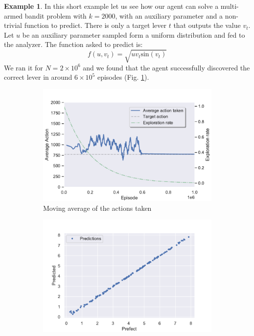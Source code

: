 \documentclass[11pt,a4paper,twoside]{report}
\newcommand{\+}{\textnormal{+} }
\theoremstyle{definition}
\newtheorem{myex}[mythm]{Example}
\numberwithin{equation}{chapter}
\begin{document}
  \begin{myex} \label{2k}
    In this short example let us see how our agent can solve a multi-armed
    bandit problem with $k=2000$, with an auxiliary parameter and a non-trivial
    function to predict. There is only a target lever $t$ that outputs the value
    $v_t$. Let $u$ be an auxiliary parameter sampled form a uniform distribution
    and fed to the analyzer. The function asked to predict is: 
    \begin{equation}
      f(u,v_t)=\sqrt{uv_t\text{sin}(v_t)}
    \end{equation}
    We ran it for $N=2\times10^6$ and we found that the agent successfully 
    discovered the correct lever in around $6\times10^5$ episodes
    (Fig. \ref{fig:ActionAverageMAB6}).
    

    \begin{figure}[]
      \centering
      \begin{subfigure}{.5\textwidth}
        \centering
        \includegraphics[width=1\linewidth]{figures/Action-MAB6.pdf}
        \caption{Moving average of the actions taken}
        \label{fig:ActionAverageMAB6}
      \end{subfigure}%
      \begin{subfigure}{.5\textwidth}
        \centering
        \includegraphics[width=1\linewidth]{figures/predictions-MBA6.pdf}

\end{subfigure}
\end{figure}
\end{myex}
\end{document}
